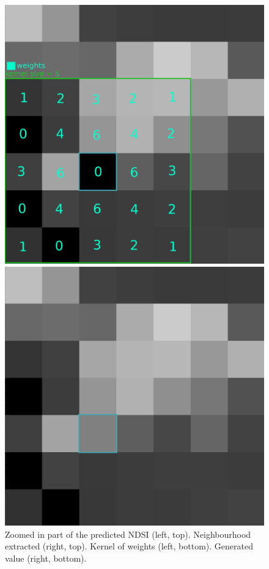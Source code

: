 \documentclass[12pt, a4paper]{report}
\begin{document}
\begin{figure}[h!]
\begin{minipage}{0.45\columnwidth}
		\end{minipage}
		\begin{minipage}{0.45\columnwidth}
			\centering
			\includegraphics[width=\linewidth]{../images/gaussian_weights.png}
		\end{minipage}
		\begin{minipage}{0.45\columnwidth}
			\centering
			\includegraphics[width=\linewidth]{../images/gaussian_pixel.png}
		\end{minipage}
		\caption{Zoomed in part of the predicted NDSI (left, top). Neighbourhood extracted (right, top). Kernel of weights (left, bottom). Generated value (right, bottom).}
		\label{fig:gaussian}
	\end{figure}
\end{document}
